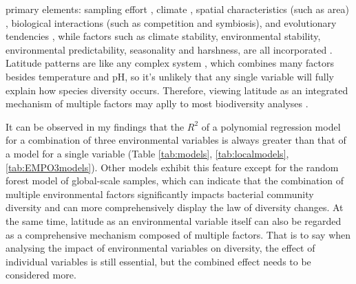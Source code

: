 \documentclass[11pt, a4paper]{article}
\begin{document}
\begin{spacing}{1.5}
primary elements: sampling effort \citep{fierer2011microbes}, climate \citep{currie1991energy, hawkins2003energy}, spatial characteristics (such as area) \citep{rosenzweig_1995, terborgh1973notion}, biological interactions (such as competition and symbiosis), and evolutionary tendencies \citep{gaston2000global, willig2003latitudinal}, while factors such as climate stability, environmental stability, environmental predictability, seasonality and harshness, are all incorporated \citep{kaufman1998structure, willig2003latitudinal}. Latitude patterns are like any complex system \citep{10011263723}, which combines many factors besides temperature and pH, so it's unlikely that any single variable will fully explain how species diversity occurs. Therefore, viewing latitude as an integrated mechanism of multiple factors may aplly to most biodiversity analyses \citep{gaston2000global, willig2003latitudinal}.

It can be observed in my findings that the $R^{2}$ of a polynomial regression model for a combination of three environmental variables is always greater than that of a model for a single variable (Table \ref{tab:models}, \ref{tab:localmodels}, \ref{tab:EMPO3models}). Other models exhibit this feature except for the random forest model of global-scale samples, which can indicate that the combination of multiple environmental factors significantly impacts bacterial community diversity and can more comprehensively display the law of diversity changes. At the same time, latitude as an environmental variable itself can also be regarded as a comprehensive mechanism composed of multiple factors. That is to say when analysing the impact of environmental variables on diversity, the effect of individual variables is still essential, but the combined effect needs to be considered more.


\end{spacing}
\end{document}
